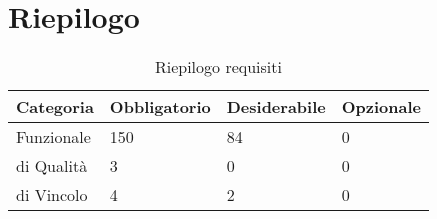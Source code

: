 \documentclass{scalatekids-article}
\begin{document}
\section{Riepilogo}

\begin{table}[H]
  \centering
  \caption{Riepilogo requisiti}
  \begin{tabular}{|l|l|l|l|}
    \hline
    Categoria & Obbligatorio & Desiderabile & Opzionale\\
    \hline
    Funzionale & 150 & 84 & 0 \\
    \hline
    di Qualità & 3 & 0 & 0 \\
    \hline
    di Vincolo & 4 & 2 & 0 \\
    \hline
  \end{tabular}
\end{table}
\newpage
\appendix
\listoftables
\listoffigures
\end{document}

